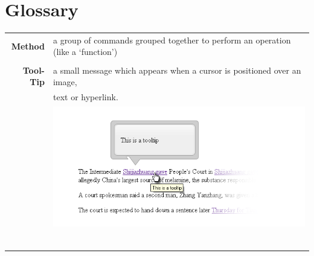 \documentclass[12pt]{article}
\begin{document}
\part*{Glossary}
\begin{table}[!htb]
\begin{tabular}{rl}
\noindent \textbf{Method}   & a group of commands grouped together to perform an operation (like a `function')\\
                             & \\
\noindent \textbf{Tool-Tip} & a small message which appears when a cursor is positioned over an image,\\
                             &  text or hyperlink.\\
                             & \hfill \includegraphics[scale=0.7]{tooltip}\\
                             & \\
                             & \\
                             & \\
                             & \\
                             & \\
                             & \\
\end{tabular}
\end{table}
\end{document}

